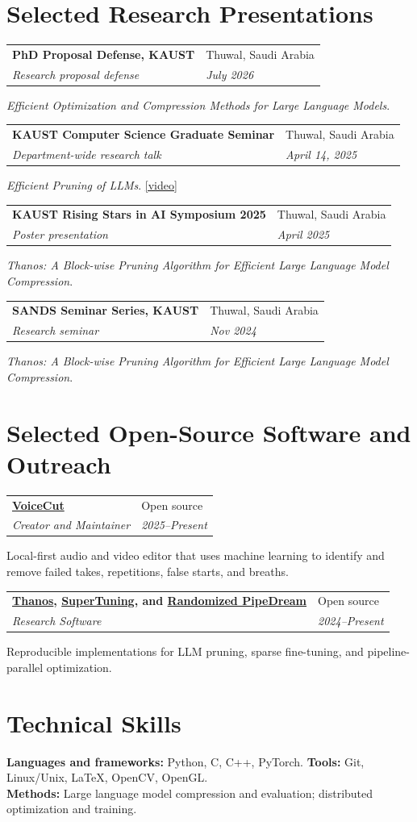 \documentclass[10pt,letterpaper]{article}
\makeatletter
\newcommand{\cventry}[4]{%
  \begin{tabularx}{\textwidth}{@{}>{\raggedright\arraybackslash}X>{\raggedleft\arraybackslash}p{1.52in}@{}}
    \textbf{#1} & \textcolor{Muted}{#2} \\
    \textit{#3} & \textit{\textcolor{Muted}{#4}}
  \end{tabularx}\vspace{0.12em}
}
\newcommand{\cvdetail}[1]{%
  {\small #1\par}\vspace{0.30em}
}
\makeatother
\begin{document}
\section{Selected Research Presentations}

\cventry{PhD Proposal Defense, KAUST}{Thuwal, Saudi Arabia}{Research proposal defense}{July 2026}
\cvdetail{\textit{Efficient Optimization and Compression Methods for Large Language Models}.}

\cventry{KAUST Computer Science Graduate Seminar}{Thuwal, Saudi Arabia}{Department-wide research talk}{April 14, 2025}
\cvdetail{\textit{Efficient Pruning of LLMs}. \href{https://www.youtube.com/watch?v=K25rVdQ-gBc}{[video]}}

\cventry{KAUST Rising Stars in AI Symposium 2025}{Thuwal, Saudi Arabia}{Poster presentation}{April 2025}
\cvdetail{\textit{Thanos: A Block-wise Pruning Algorithm for Efficient Large Language Model Compression}.}

\cventry{SANDS Seminar Series, KAUST}{Thuwal, Saudi Arabia}{Research seminar}{Nov 2024}
\cvdetail{\textit{Thanos: A Block-wise Pruning Algorithm for Efficient Large Language Model Compression}.}

\section{Selected Open-Source Software and Outreach}

\cventry{\href{https://github.com/vectozavr/voicecut}{VoiceCut}}{Open source}{Creator and Maintainer}{2025--Present}
\cvdetail{Local-first audio and video editor that uses machine learning to identify and remove failed takes, repetitions, false starts, and breaths.}

\cventry{\href{https://github.com/vectozavr/thanos}{Thanos}, \href{https://github.com/vectozavr/SuperTuning}{SuperTuning}, and \href{https://github.com/vectozavr/randomized-pipedream}{Randomized PipeDream}}{Open source}{Research Software}{2024--Present}
\cvdetail{Reproducible implementations for LLM pruning, sparse fine-tuning, and pipeline-parallel optimization.}

\section{Technical Skills}

{\small
  \textbf{Languages and frameworks:} Python, C, C++, PyTorch. \quad
  \textbf{Tools:} Git, Linux/Unix, LaTeX, OpenCV, OpenGL.\\
  \textbf{Methods:} Large language model compression and evaluation; distributed optimization and training.
}
\end{document}

